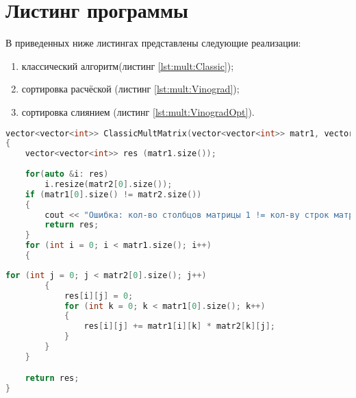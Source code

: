     \section{Листинг программы}
        В приведенных ниже листингах представлены следующие реализации: 
        \begin{enumerate}
            \item классический алгоритм(листинг \ref{lst:mult:Classic});
            \item сортировка расчёской (листинг \ref{lst:mult:Vinograd});
            \item сортировка слиянием (листинг \ref{lst:mult:VinogradOpt}).
        \end{enumerate}
        \par \text{           }
        \begin{lstlisting}[language=C++, label=lst:mult:Classic, caption=Алгоритм классического умножения]
vector<vector<int>> ClassicMultMatrix(vector<vector<int>> matr1, vector<vector<int>> matr2)
{
    vector<vector<int>> res (matr1.size());
    
    for(auto &i: res)
        i.resize(matr2[0].size());
    if (matr1[0].size() != matr2.size())
    {
        cout << "Ошибка: кол-во столбцов матрицы 1 != кол-ву строк матрицы 2" << endl;
        return res;
    }
    for (int i = 0; i < matr1.size(); i++)
    {
    \end{lstlisting}
    \begin{lstlisting}[language=C++, label=lst:mult:Classic_1, caption=Алгоритм классического умножения]
        for (int j = 0; j < matr2[0].size(); j++)
        {
            res[i][j] = 0;
            for (int k = 0; k < matr1[0].size(); k++)
            {
                res[i][j] += matr1[i][k] * matr2[k][j];
            }
        }
    }

    return res;
}
        \end{lstlisting}

